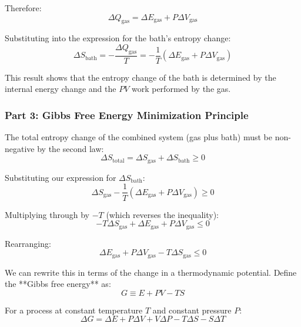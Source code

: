 \documentclass[10pt,twocoloumn]{article}
\begin{document}
Therefore:
\begin{equation}\Delta Q_{\text{gas}} = \Delta E_{\text{gas}} + P \Delta V_{\text{gas}}\end{equation}

Substituting into the expression for the bath's entropy change:
\begin{equation}\boxed{\Delta S_{\text{bath}} = -\frac{\Delta Q_{\text{gas}}}{T} = -\frac{1}{T}\left(\Delta E_{\text{gas}} + P \Delta V_{\text{gas}}\right)}\end{equation}

This result shows that the entropy change of the bath is determined by the internal energy change and the $PV$ work performed by the gas.

\subsubsection*{Part 3: Gibbs Free Energy Minimization Principle}

The total entropy change of the combined system (gas plus bath) must be non-negative by the second law:
\begin{equation}\Delta S_{\text{total}} = \Delta S_{\text{gas}} + \Delta S_{\text{bath}} \geq 0\end{equation}

Substituting our expression for $\Delta S_{\text{bath}}$:
\begin{equation}\Delta S_{\text{gas}} - \frac{1}{T}\left(\Delta E_{\text{gas}} + P \Delta V_{\text{gas}}\right) \geq 0\end{equation}

Multiplying through by $-T$ (which reverses the inequality):
\begin{equation}-T\Delta S_{\text{gas}} + \Delta E_{\text{gas}} + P \Delta V_{\text{gas}} \leq 0\end{equation}

Rearranging:
\begin{equation}\Delta E_{\text{gas}} + P \Delta V_{\text{gas}} - T\Delta S_{\text{gas}} \leq 0\end{equation}

We can rewrite this in terms of the change in a thermodynamic potential. Define the **Gibbs free energy** as:
\begin{equation}G \equiv E + PV - TS\end{equation}

For a process at constant temperature $T$ and constant pressure $P$:
\begin{equation}\Delta G = \Delta E + P\Delta V + V\Delta P - T\Delta S - S\Delta T\end{equation}
\end{document}

